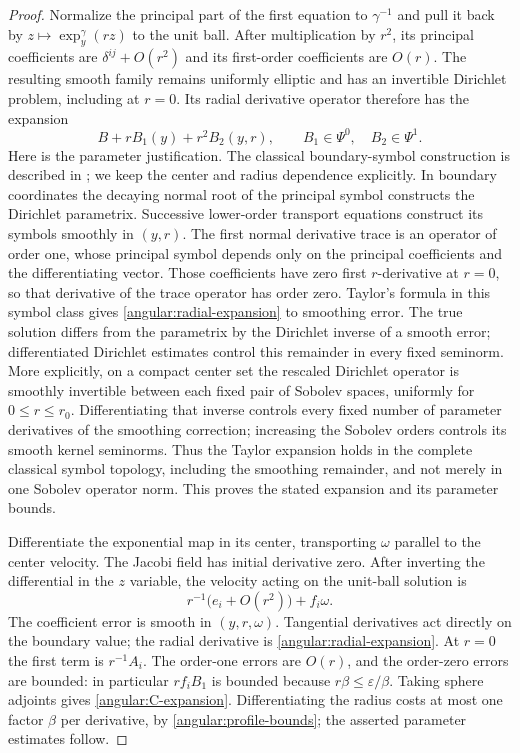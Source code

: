 \documentclass[11pt,a4paper]{article}
\newcommand{\eps}{\varepsilon}
\numberwithin{equation}{section}
\begin{document}
\begin{proof}
Normalize the principal part of the first equation to $\gamma^{-1}$ and
pull it back by $z\mapsto\exp_y^\gamma(rz)$ to the unit ball.  After
multiplication by $r^2$, its principal coefficients are
$\delta^{ij}+O(r^2)$ and its first-order coefficients are $O(r)$.
The resulting smooth family remains uniformly elliptic and has an
invertible Dirichlet problem, including at $r=0$.  Its radial derivative
operator therefore has the expansion
\begin{equation}\label{angular:radial-expansion}
 B+r B_1(y)+r^2 B_2(y,r),\qquad
 B_1\in\Psi^0,\quad B_2\in\Psi^1.
\end{equation}
Here is the parameter justification.  The classical boundary-symbol
construction is described in
\citep[Theorem~1.1(i) and Proposition~3.1]{JoshiLionheart2005};
we keep the center and radius dependence explicitly.
In boundary coordinates the decaying
normal root of the principal symbol constructs the Dirichlet parametrix.
Successive lower-order transport equations construct its symbols smoothly
in $(y,r)$.  The first normal derivative trace is an operator of order one,
whose principal symbol depends only on the principal coefficients and the
differentiating vector.  Those coefficients have zero first $r$-derivative
at $r=0$, so that derivative of the trace operator has order zero.  Taylor's
formula in this symbol class gives \eqref{angular:radial-expansion} to
smoothing error.  The true solution differs from the parametrix by the
Dirichlet inverse of a smooth error; differentiated Dirichlet estimates
control this remainder in every fixed seminorm.  More explicitly, on a
compact center set the rescaled Dirichlet operator is smoothly
invertible between each fixed pair of Sobolev spaces, uniformly for
$0\le r\le r_0$.  Differentiating that inverse controls every fixed
number of parameter derivatives of the smoothing correction; increasing
the Sobolev orders controls its smooth kernel seminorms.  Thus the
Taylor expansion holds in the complete classical symbol topology,
including the smoothing remainder, and not merely in one Sobolev
operator norm.  This proves the stated expansion and its parameter bounds.

Differentiate the exponential map in its center, transporting $\omega$
parallel to the center velocity.  The Jacobi field has initial derivative
zero.  After inverting the differential in the $z$ variable, the velocity
acting on the unit-ball solution is
\[
 r^{-1}\bigl(e_i+O(r^2)\bigr)+f_i\omega.
\]
The coefficient error is smooth in $(y,r,\omega)$.  Tangential derivatives
act directly on the boundary value; the radial derivative is
\eqref{angular:radial-expansion}.  At $r=0$ the first term is $r^{-1}A_i$.
The order-one errors are $O(r)$, and the order-zero errors are bounded:
in particular $r f_i B_1$ is bounded because $r\beta\le\eps/\beta$.
Taking sphere adjoints gives \eqref{angular:C-expansion}.  Differentiating
the radius costs at most one factor $\beta$ per derivative, by
\eqref{angular:profile-bounds}; the asserted parameter estimates follow.


\end{proof}
\end{document}
